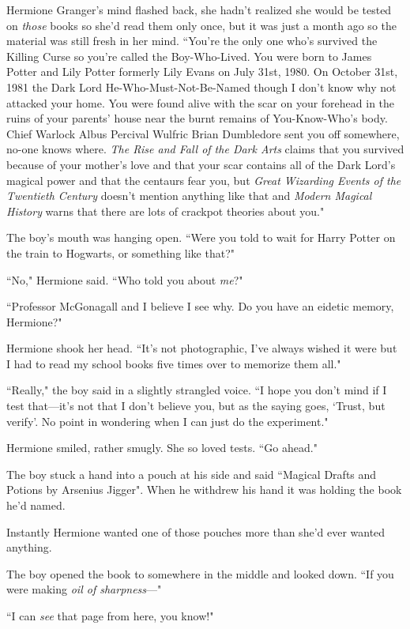 Hermione Granger's mind flashed back, she hadn't realized she would be tested on \emph{those} books so she'd read them only once, but it was just a month ago so the material was still fresh in her mind. ``You're the only one who's survived the Killing Curse so you're called the Boy-Who-Lived. You were born to James Potter and Lily Potter formerly Lily Evans on July 31st, 1980. On October 31st, 1981 the Dark Lord He-Who-Must-Not-Be-Named though I don't know why not attacked your home. You were found alive with the scar on your forehead in the ruins of your parents' house near the burnt remains of You-Know-Who's body. Chief Warlock Albus Percival Wulfric Brian Dumbledore sent you off somewhere, no-one knows where. \emph{The Rise and Fall of the Dark Arts} claims that you survived because of your mother's love and that your scar contains all of the Dark Lord's magical power and that the centaurs fear you, but \emph{Great Wizarding Events of the Twentieth Century} doesn't mention anything like that and \emph{Modern Magical History} warns that there are lots of crackpot theories about you."

The boy's mouth was hanging open. ``Were you told to wait for Harry Potter on the train to Hogwarts, or something like that?"

``No," Hermione said. ``Who told you about \emph{me}?"

``Professor McGonagall and I believe I see why. Do you have an eidetic memory, Hermione?"

Hermione shook her head. ``It's not photographic, I've always wished it were but I had to read my school books five times over to memorize them all."

``Really," the boy said in a slightly strangled voice. ``I hope you don't mind if I test that—it's not that I don't believe you, but as the saying goes, `Trust, but verify'. No point in wondering when I can just do the experiment."

Hermione smiled, rather smugly. She so loved tests. ``Go ahead."

The boy stuck a hand into a pouch at his side and said ``Magical Drafts and Potions by Arsenius Jigger". When he withdrew his hand it was holding the book he'd named.

Instantly Hermione wanted one of those pouches more than she'd ever wanted anything.

The boy opened the book to somewhere in the middle and looked down. ``If you were making \emph{oil of sharpness}—"

``I can \emph{see} that page from here, you know!"


